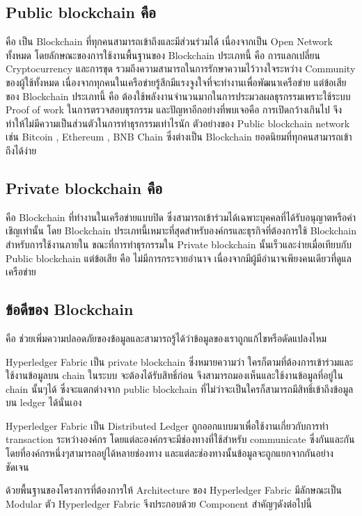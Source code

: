 \subsection{Public blockchain คือ}
\cite{Blockchain_b}
คือ เป็น Blockchain ที่ทุกคนสามารถเข้าถึงและมีส่วนร่วมได้ เนื่องจากเป็น Open Network ทั้งหมด โดยลักษณะของการใช้งานพื้นฐานของ Blockchain ประเภทนี้ คือ การแลกเปลี่ยน Cryptocurrency และการขุด รวมถึงความสามารถในการรักษาความไว้วางใจระหว่าง Community ของผู้ใช้ทั้งหมด 
เนื่องจากทุกคนในเครือข่ายรู้สึกมีแรงจูงใจที่จะทำงานเพื่อพัฒนาเครือข่าย แต่ข้อเสียของ Blockchain ประเภทนี้ คือ ต้องใช้พลังงานจำนวนมากในการประมวลผลธุรกรรมเพราะใช้ระบบ Proof of work ในการตรวจสอบธุรกรรม และปัญหาอีกอย่างที่พบเจอคือ การเปิดกว้างเกินไป จึงทำให้ไม่มีความเป็นส่วนตัวในการทำธุรกรรมเท่าไรนัก
ตัวอย่างของ Public blockchain network เช่น Bitcoin  , Ethereum , BNB Chain ซึ่งต่างเป็น Blockchain ยอดนิยมที่ทุกคนสามารถเข้าถึงได้ง่าย
\subsection{Private blockchain คือ}
\cite{Blockchain_b}
คือ Blockchain ที่ทำงานในเครือข่ายแบบปิด ซึ่งสามารถเข้าร่วมได้เฉพาะบุคคลที่ได้รับอนุญาตหรือคำเชิญเท่านั้น โดย Blockchain ประเภทนี้เหมาะที่สุดสำหรับองค์กรและธุรกิจที่ต้องการใช้ Blockchain สำหรับการใช้งานภายใน 
ขณะที่การทำธุรกรรมใน Private blockchain นั้นเร็วและง่ายเมื่อเทียบกับ Public blockchain แต่ข้อเสีย คือ ไม่มีการกระจายอำนาจ เนื่องจากมีผู้มีอำนาจเพียงคนเดียวที่ดูแลเครือข่าย
\subsection{ข้อดีของ Blockchain}
\cite{Blockchain_a}
คือ ช่วยเพิ่มความปลอดภัยของข้อมูลและสามารถรู้ได้ว่าข้อมูลของเราถูกแก้ไขหรือดัดแปลงไหม


\cite{Hyperledger} 
Hyperledger Fabric เป็น private blockchain ซึ่งหมายความว่า ใครก็ตามที่ต้องการเข้าร่วมและใช้งานข้อมูลบน chain ในระบบ จะต้องได้รับสิทธิ์ก่อน จึงสามารถมองเห็นและใช้งานข้อมูลที่อยู่ใน chain นั้นๆได้ ซึ่งจะแตกต่างจาก public blockchain ที่ไม่ว่าจะเป็นใครก็สามารถมีสิทธิ์เข้าถึงข้อมูลบน ledger ได้นั่นเอง

Hyperledger Fabric เป็น Distributed Ledger ถูกออกแบบมาเพื่อใช้งานเกี่ยวกับการทำ transaction ระหว่างองค์กร โดยแต่ละองค์กรจะมีช่องทางที่ใช้สำหรับ communicate ซึ่งกันและกัน โดยที่องค์กรหนึ่งๆสามารถอยู่ได้หลายช่องทาง และแต่ละช่องทางนั้นข้อมูลจะถูกแยกจากกันอย่างชัดเจน

ด้วยพื้นฐานของโครงการที่ต้องการให้ Architecture ของ Hyperledger Fabric มีลักษณะเป็น Modular ตัว Hyperledger Fabric จึงประกอบด้วย Component สำคัญๆดังต่อไปนี้
